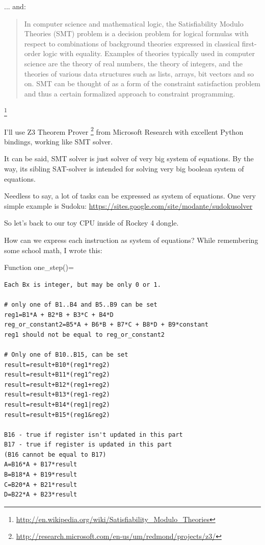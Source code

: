 ... and:

\begin{framed}
\begin{quotation}
In computer science and mathematical logic, the Satisfiability Modulo Theories (SMT) problem is a decision problem for logical formulas with respect to combinations of background theories expressed in classical first-order logic with equality. Examples of theories typically used in computer science are the theory of real numbers, the theory of integers, and the theories of various data structures such as lists, arrays, bit vectors and so on. SMT can be thought of as a form of the constraint satisfaction problem and thus a certain formalized approach to constraint programming.
\end{quotation}
\end{framed}\footnote{\url{http://en.wikipedia.org/wiki/Satisfiability_Modulo_Theories}}

I'll use Z3 Theorem Prover
\footnote{\url{http://research.microsoft.com/en-us/um/redmond/projects/z3/}} from Microsoft Research with excellent 
Python bindings, working like \ac{SMT} solver.

It can be said, \ac{SMT} solver is just solver of very big system of equations. 
By the way, its sibling \ac{SAT}-solver is intended for solving very big boolean system of equations.

Needless to say, a lot of tasks can be expressed as system of equations. 
One very simple example is Sudoku: \url{https://sites.google.com/site/modante/sudokusolver}

So let's back to our toy CPU inside of Rockey 4 dongle.

How can we express each instruction as system of equations? While remembering some school math, I wrote this:

Function one\_step()=

\begin{lstlisting}
Each Bx is integer, but may be only 0 or 1.

# only one of B1..B4 and B5..B9 can be set
reg1=B1*A + B2*B + B3*C + B4*D
reg_or_constant2=B5*A + B6*B + B7*C + B8*D + B9*constant
reg1 should not be equal to reg_or_constant2

# Only one of B10..B15, can be set
result=result+B10*(reg1*reg2)
result=result+B11*(reg1^reg2)
result=result+B12*(reg1+reg2)
result=result+B13*(reg1-reg2)
result=result+B14*(reg1|reg2)
result=result+B15*(reg1&reg2)

B16 - true if register isn't updated in this part
B17 - true if register is updated in this part
(B16 cannot be equal to B17)
A=B16*A + B17*result
B=B18*A + B19*result
C=B20*A + B21*result
D=B22*A + B23*result
\end{lstlisting}

